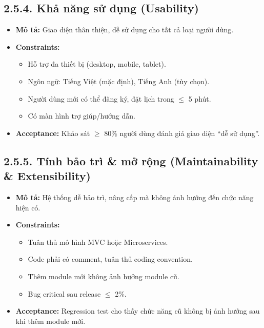 
\subsection*{2.5.4. Khả năng sử dụng (Usability)}
\begin{itemize}
    \item \textbf{Mô tả:} Giao diện thân thiện, dễ sử dụng cho tất cả loại người dùng.
    \item \textbf{Constraints:} 
    \begin{itemize}
        \item Hỗ trợ đa thiết bị (desktop, mobile, tablet).
        \item Ngôn ngữ: Tiếng Việt (mặc định), Tiếng Anh (tùy chọn).
        \item Người dùng mới có thể đăng ký, đặt lịch trong $\leq$ 5 phút.
        \item Có màn hình trợ giúp/hướng dẫn.
    \end{itemize}
    \item \textbf{Acceptance:} Khảo sát $\geq$ 80\% người dùng đánh giá giao diện “dễ sử dụng”.

\end{itemize}


\subsection*{2.5.5. Tính bảo trì \& mở rộng (Maintainability \& Extensibility)}
\begin{itemize}
    \item \textbf{Mô tả:} Hệ thống dễ bảo trì, nâng cấp mà không ảnh hưởng đến chức năng hiện có.
    \item \textbf{Constraints:}
    \begin{itemize}
        \item Tuân thủ mô hình MVC hoặc Microservices.
        \item Code phải có comment, tuân thủ coding convention.
        \item Thêm module mới không ảnh hưởng module cũ.
        \item Bug critical sau release $\leq$ 2\%.
    \end{itemize}
    \item \textbf{Acceptance:} Regression test cho thấy chức năng cũ không bị ảnh hưởng sau khi thêm module mới.
\end{itemize}

